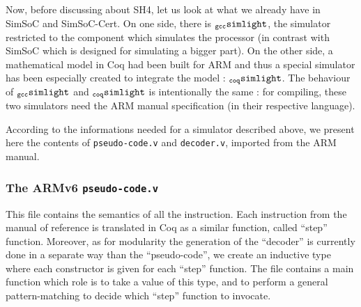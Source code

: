 \documentclass[a4paper, 11pt]{article}
\newcommand{\gccSL}{$_{\tt gcc}{\tt simlight}$\xspace}
\newcommand{\SL}{$_{\tt coq}{\tt simlight}$\xspace}
\newcommand{\simgen}{{\tt simgen}\xspace}
\newcommand{\gccC}{$_{\tt gcc}{\tt C}$\xspace}
\begin{document}
Now, before discussing about SH4, let us look at what we already have in SimSoC and SimSoC-Cert. On one side, there is \gccSL, the simulator restricted to the component which simulates the processor (in contrast with SimSoC which is designed for simulating a bigger part). 
On the other side, a mathematical model in Coq had been built for ARM and thus a special simulator has been especially created to integrate the model : \SL.
The behaviour of \gccSL and \SL is intentionally the same : for compiling, these two simulators need the ARM manual specification (in their respective language).%

According to the informations needed for a simulator described above, we present here the contents of \verb|pseudo-code.v| and \verb|decoder.v|, imported from the ARM manual.


\subsubsection{The ARMv6 {\tt pseudo-code.v}}
This file contains the semantics of all the instruction. Each instruction from the manual of reference is translated in Coq as a similar function, called ``step'' function. Moreover, as for modularity the generation of the ``decoder'' is currently done in a separate way than the ``pseudo-code'', we create an inductive type where each constructor is given for each ``step'' function.
The file contains a main function which role is to take a value of this type, and to perform a general pattern-matching to decide which ``step'' function to invocate.
\end{document}
